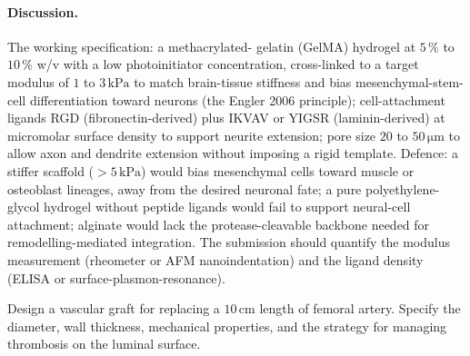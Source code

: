 \paragraph{Discussion.} The working specification: a methacrylated-
gelatin (GelMA) hydrogel at $5\,\%$ to $10\,\%$ w/v with a low
photoinitiator concentration, cross-linked to a target modulus of
$1$ to $3\,\text{kPa}$ to match brain-tissue stiffness and bias
mesenchymal-stem-cell differentiation toward neurons (the Engler
2006 principle); cell-attachment ligands RGD (fibronectin-derived)
plus IKVAV or YIGSR (laminin-derived) at micromolar surface density
to support neurite extension; pore size $20$ to $50\,\si{\micro\meter}$
to allow axon and dendrite extension without imposing a rigid
template. Defence: a stiffer scaffold ($> 5\,\text{kPa}$) would
bias mesenchymal cells toward muscle or osteoblast lineages, away
from the desired neuronal fate; a pure polyethylene-glycol hydrogel
without peptide ligands would fail to support neural-cell
attachment; alginate would lack the protease-cleavable backbone
needed for remodelling-mediated integration. The submission should
quantify the modulus measurement (rheometer or AFM nanoindentation)
and the ligand density (ELISA or surface-plasmon-resonance).

\begin{exercise}
Design a vascular graft for replacing a $10\,\text{cm}$ length of
femoral artery. Specify the diameter, wall thickness, mechanical
properties, and the strategy for managing thrombosis on the
luminal surface.
\end{exercise}

